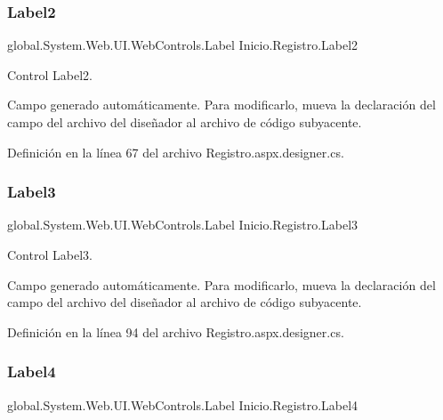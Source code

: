 \subsubsection{\texorpdfstring{Label2}{Label2}}
{\footnotesize\ttfamily global.\+System.\+Web.\+U\+I.\+Web\+Controls.\+Label Inicio.\+Registro.\+Label2\hspace{0.3cm}{\ttfamily [protected]}}



Control Label2. 

Campo generado automáticamente. Para modificarlo, mueva la declaración del campo del archivo del diseñador al archivo de código subyacente. 

Definición en la línea 67 del archivo Registro.\+aspx.\+designer.\+cs.

\mbox{\label{classInicio_1_1Registro_ae363d31acf3834211c8e17996e39782f}} 
\subsubsection{\texorpdfstring{Label3}{Label3}}
{\footnotesize\ttfamily global.\+System.\+Web.\+U\+I.\+Web\+Controls.\+Label Inicio.\+Registro.\+Label3\hspace{0.3cm}{\ttfamily [protected]}}



Control Label3. 

Campo generado automáticamente. Para modificarlo, mueva la declaración del campo del archivo del diseñador al archivo de código subyacente. 

Definición en la línea 94 del archivo Registro.\+aspx.\+designer.\+cs.

\mbox{\label{classInicio_1_1Registro_a0cb8176c99e6ad87d5f77896e1aaf5d1}} 
\subsubsection{\texorpdfstring{Label4}{Label4}}
{\footnotesize\ttfamily global.\+System.\+Web.\+U\+I.\+Web\+Controls.\+Label Inicio.\+Registro.\+Label4\hspace{0.3cm}{\ttfamily [protected]}}



